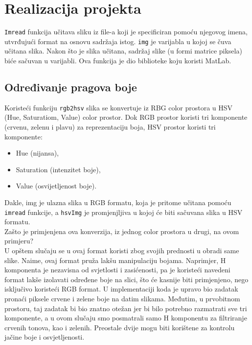 \documentclass[a4paper,12pt]{article}
\begin{document}
\section{Realizacija projekta}

\texttt{Imread} funkcija učitava sliku iz file-a koji je specificiran pomoću njegovog imena, utvrđujući format  na osnovu sadržaja istog. 
\texttt{img} je varijabla u kojoj se čuva učitana slika. 
Nakon što je slika učitana, sadržaj slike (u formi matrice piksela) biće sačuvan u varijabli. Ova funkcija je dio biblioteke koju koristi MatLab.\\
\subsection{Određivanje pragova boje}


Koristeći funkciju \texttt{rgb2hsv} slika se konvertuje iz RBG color prostora u HSV (Hue, Saturatiom, Value) color prostor. 
Dok RGB prostor koristi tri komponente (crvenu, zelenu i plavu) za reprezentaciju boja, HSV prostor koristi tri komponente:\\
\begin{itemize}
    \item Hue (nijansa),
    \item Saturation (intenzitet boje),
    \item Value (osvijetljenost boje).
\end{itemize}

Dakle, img je ulazna slika u RGB formatu, koja je pritome učitana pomoću \texttt {imread} funkcije, a \texttt{hsvImg} je promjenjljiva u kojoj će biti sačuvana slika u HSV formatu. \\

\indent Zašto je primjenjena ova konverzija, iz jednog color prostora u drugi, na ovom primjeru?\\

U opštem slučaju se u ovaj format koristi zbog svojih prednosti u obradi same slike. 
Naime, ovaj format pruža lakšu manipulaciju bojama. 
Naprimjer, H komponenta je nezavisna od svjetlosti i zasićenosti, pa je koristeći navedeni format lakše izolavati određene boje na slici, što će kasnije biti primjenjeno, nego isključivo koristeći RGB format. 
U implementaciji koda je upravo bio zadatak pronaći piksele crvene i zelene boje na datim slikama. 
Međutim, u prvobitnom prostoru, taj zadatak bi bio znatno otežan jer bi bilo potrebno razmatrati sve tri komponente, a u ovom slučaju smo posmatrali samo H komponentu za filtriranje crvenih tonova, kao i zelenih. 
Preostale dvije mogu biti korištene za kontrolu jačine boje i osvjetljenosti. 
\end{document}
